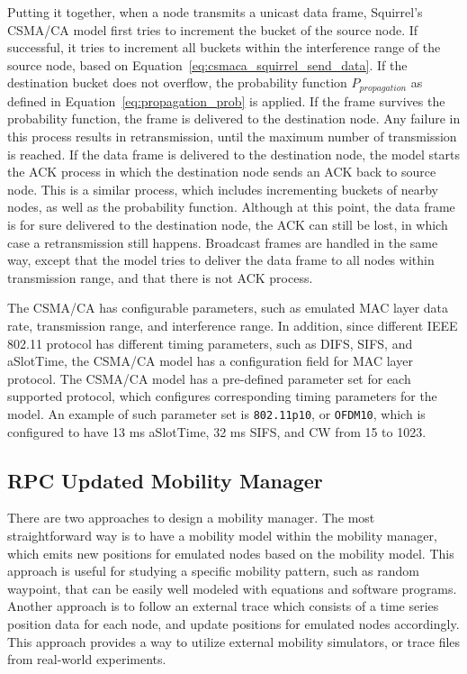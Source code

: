 \documentclass[12pt]{report}
\begin{document}
Putting it together, when a node transmits a unicast data frame, Squirrel's CSMA/CA model first tries to increment the bucket of the source node. If successful, it tries to increment all buckets within the interference range of the source node, based on Equation~\ref{eq:csmaca_squirrel_send_data}. If the destination bucket does not overflow, the probability function $P_{propagation}$ as defined in Equation~\ref{eq:propagation_prob} is applied. If the frame survives the probability function, the frame is delivered to the destination node. Any failure in this process results in retransmission, until the maximum number of transmission is reached. If the data frame is delivered to the destination node, the model starts the ACK process in which the destination node sends an ACK back to source node. This is a similar process, which includes incrementing buckets of nearby nodes, as well as the probability function. Although at this point, the data frame is for sure delivered to the destination node, the ACK can still be lost, in which case a retransmission still happens. Broadcast frames are handled in the same way, except that the model tries to deliver the data frame to all nodes within transmission range, and that there is not ACK process.

The CSMA/CA has configurable parameters, such as emulated MAC layer data rate, transmission range, and interference range. In addition, since different IEEE 802.11 protocol has different timing parameters, such as DIFS, SIFS, and aSlotTime, the CSMA/CA model has a configuration field for MAC layer protocol. The CSMA/CA model has a pre-defined parameter set for each supported protocol, which configures corresponding timing parameters for the model. An example of such parameter set is \texttt{802.11p10}, or \texttt{OFDM10}, which is configured to have 13 ms aSlotTime, 32 ms SIFS, and CW from 15 to 1023.


\subsection{RPC Updated Mobility Manager}
\label{sec:rpc_mobility_manager}

There are two approaches to design a mobility manager. The most straightforward way is to have a mobility model within the mobility manager, which emits new positions for emulated nodes based on the mobility model. This approach is useful for studying a specific mobility pattern, such as random waypoint, that can be easily well modeled with equations and software programs. Another approach is to follow an external trace which consists of a time series position data for each node, and update positions for emulated nodes accordingly. This approach provides a way to utilize external mobility simulators, or trace files from real-world experiments.
\end{document}
